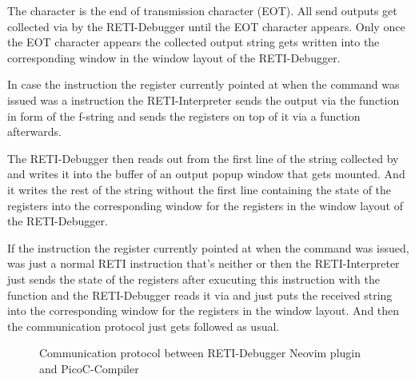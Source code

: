 \documentclass{report}
\begin{document}
The character  is the end of transmission character (\alert{EOT}). All send outputs get collected via  by the RETI-Debugger until the EOT character  appears. Only once the EOT character appears the collected output  string gets written into the corresponding window in the window layout of the RETI-Debugger.


In case the instruction the  register currently pointed at when the  command was issued was a  instruction the RETI-Interpreter sends the output via the  function in form of the f-string  and sends the registers on top of it via a  function afterwards.

The RETI-Debugger then reads out  from the first line of the  string collected by  and writes it into the buffer of an output popup window that gets mounted. And it writes the rest of the  string without the first line containing the state of the registers into the corresponding window for the registers in the window layout of the RETI-Debugger.

If the instruction the  register currently pointed at when the  command was issued, was just a normal RETI instruction that's neither  or  then the RETI-Interpreter just sends the state of the registers after exucuting this instruction with the  function and the RETI-Debugger reads it via  and just puts the received  string into the corresponding window for the registers in the window layout. And then the communication protocol just gets followed as usual.

\begin{figure}
	\centering
	\caption{Communication protocol between RETI-Debugger Neovim plugin and PicoC-Compiler}
	\label{fig:communication protocol between reti-debugger neovim plugin and picoc-compiler}
\end{figure}
\end{document}
